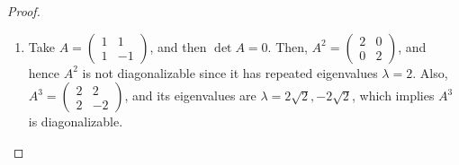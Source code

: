\documentclass[11pt]{book}
\theoremstyle{definition}
\numberwithin{equation}{chapter}
\begin{document}
\begin{proof}
\begin{enumerate}[label=(\alph*)]
    \item Take $A = \begin{pmatrix} 1 & 1 \\ 1 & -1  \end{pmatrix}$, and then $\det A = 0$. Then, $A^2 = \begin{pmatrix} 2 & 0 \\ 0 & 2  \end{pmatrix}$, and hence $A^2$ is not diagonalizable since it has repeated eigenvalues $\lambda = 2$. Also, $A^3 = \begin{pmatrix} 2 & 2 \\ 2 & -2  \end{pmatrix}$, and its eigenvalues are $\lambda = 2\sqrt{2}, - 2 \sqrt{2}$, which implies $A^3$ is diagonalizable.
\end{enumerate}
\end{proof}

\medskip
\end{document}
